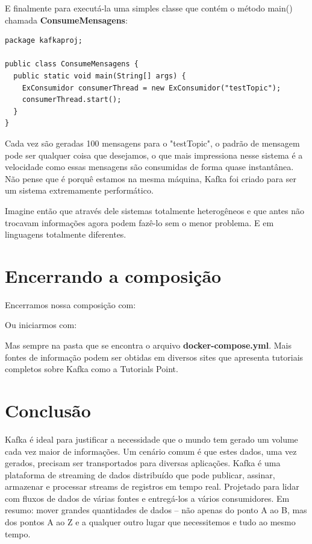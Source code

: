 \documentclass[a4paper,11pt]{article}
\begin{document}
E finalmente para executá-la uma simples classe que contém o método main() chamada \textbf{ConsumeMensagens}:
\begin{lstlisting}[]
package kafkaproj;

public class ConsumeMensagens {
  public static void main(String[] args) {
    ExConsumidor consumerThread = new ExConsumidor("testTopic");
    consumerThread.start();
  }
}
\end{lstlisting}

Cada vez são geradas 100 mensagens para o "testTopic", o padrão de mensagem pode ser qualquer coisa que desejamos, o que mais impressiona nesse sistema é a velocidade como essas mensagens são consumidas de forma quase instantânea. Não pense que é porquê estamos na mesma máquina, Kafka foi criado para ser um sistema extremamente performático. 

Imagine então que através dele sistemas totalmente heterogêneos e que antes não trocavam informações agora podem fazê-lo sem o menor problema. E em linguagens totalmente diferentes. 

\section{Encerrando a composição}
Encerramos nossa composição com: \\

Ou iniciarmos com: \\

Mas sempre na pasta que se encontra o arquivo \textbf{docker-compose.yml}. Mais fontes de informação podem ser obtidas em diversos sites que apresenta tutoriais completos sobre Kafka como a Tutorials Point\cite{tutorialspoint}.
	
\section{Conclusão}
Kafka é ideal para justificar a necessidade que o mundo tem gerado um volume cada vez maior de informações. Um cenário comum é que estes dados, uma vez gerados, precisam ser transportados para diversas aplicações. Kafka é uma plataforma de streaming de dados distribuído que pode publicar, assinar, armazenar e processar streams de registros em tempo real. Projetado para lidar com fluxos de dados de várias fontes e entregá-los a vários consumidores. Em resumo: mover grandes quantidades de dados – não apenas do ponto A ao B, mas dos pontos A ao Z e a qualquer outro lugar que necessitemos e tudo ao mesmo tempo.
\end{document}
